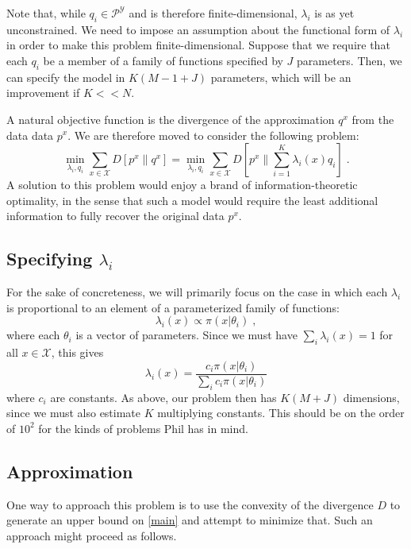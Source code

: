 \documentclass[english]{scrartcl}
\begin{document}
		Note that, while $q_i \in \mathcal{P}^{\mathcal{Y}}$ and is therefore finite-dimensional, $\lambda_i$ is as yet unconstrained. We need to impose an assumption about the functional form of $\lambda_i$ in order to make this problem finite-dimensional. Suppose that we require that each $q_i$ be a member of a family of functions specified by $J$ parameters. Then, we can specify the model in $K(M-1 + J)$ parameters, which will be an improvement if $K << N$.

		A natural objective function is the divergence of the approximation $q^x$ from the data data $p^x$. We are therefore moved to consider the following problem:
		\begin{equation}
			\min_{\lambda_i, q_i} \sum_{x \in \mathcal{X}} D[p^x\|q^x] = \min_{\lambda_i, q_i} \sum_{x \in \mathcal{X}} D\left[p^x\bigg\|\sum_{i=1}^K \lambda_i(x) q_i\right]\;. \label{main}
		\end{equation}
		A solution to this problem would enjoy a brand of information-theoretic optimality, in the sense that such a model would require the least additional information to fully recover the original data $p^x$.

	\subsection{Specifying $\lambda_i$}
		For the sake of concreteness, we will primarily focus on the case in which each $\lambda_i$ is proportional to an element of a parameterized family of functions:
		\begin{equation}
			\lambda_i(x) \propto \pi(x|\theta_i)\;,
		\end{equation}
		where each $\theta_i$ is a vector of parameters. Since we must have $\sum_i \lambda_i(x) = 1$ for all $x\in \mathcal{X}$, this gives
		\begin{equation}
			\lambda_i(x) = \frac{c_i\pi(x|\theta_i)}{\sum_ic_i\pi(x|\theta_i)}
		\end{equation}
		where $c_i$ are constants. As above, our problem then has $K(M+J)$ dimensions, since we must also estimate $K$ multiplying constants. This  should be on the order of $10^2$ for the kinds of problems Phil has in mind.
	\subsection{Approximation}
		One way to approach this problem is to use the convexity of the divergence $D$ to generate an upper bound on \eqref{main} and attempt to minimize that. Such an approach might proceed as follows.
\end{document}
